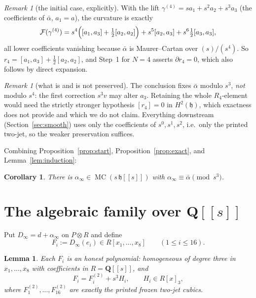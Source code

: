 \documentclass[11pt]{article}
\newtheorem{lemma}[theorem]{Lemma}
\newtheorem{corollary}[theorem]{Corollary}
\theoremstyle{definition}
\theoremstyle{remark}
\newtheorem{remark}[theorem]{Remark}
\newcommand{\QQ}{\mathbf Q}
\newcommand{\MC}{\operatorname{MC}}
\newcommand{\h}{\mathfrak h}
\begin{document}
\begin{remark}[the initial case, explicitly]\label{rem:initial}
With the lift $\gamma^{(4)}=sa_1+s^2a_2+s^3a_3$ (the coefficients of
$\bar\alpha$, $a_1=a$), the curvature is exactly
\[
 \mathcal F(\gamma^{(4)})
 =s^4\Bigl([a_1,a_3]+\tfrac12[a_2,a_2]\Bigr)
 +s^5[a_2,a_3]+s^6\tfrac12[a_3,a_3],
\]
all lower coefficients vanishing because $\bar\alpha$ is Maurer--Cartan
over $(s)/(s^4)$.  So $r_4=[a_1,a_3]+\tfrac12[a_2,a_2]$, and Step~1 for
$N=4$ asserts $\partial r_4=0$, which also follows by direct expansion.
\end{remark}

\begin{remark}[what is and is not preserved]\label{rem:preserved}
The conclusion fixes $\bar\alpha$ modulo $s^3$, \emph{not} modulo $s^4$:
the first correction $s^3v$ may alter $a_3$.  Retaining the whole
$R_4$-element would need the strictly stronger hypothesis $[r_4]=0$ in
$H^2(\h)$, which exactness does not provide and which we do not claim.
Everything downstream (Section~\ref{sec:smooth}) uses only the coefficients
of $s^0,s^1,s^2$, i.e.\ only the printed two-jet, so the weaker
preservation suffices.
\end{remark}

Combining Proposition~\ref{prop:start}, Proposition~\ref{prop:exact}, and
Lemma~\ref{lem:induction}:

\begin{corollary}\label{cor:mcinfty}
There is $\alpha_\infty\in\MC(s\,\h[[s]])$ with
$\alpha_\infty\equiv\bar\alpha\pmod{s^3}$.
\end{corollary}

\section{The algebraic family over $\QQ[[s]]$}\label{sec:family}

Put $D_\infty=d+\alpha_\infty$ on $P\otimes R$ and define
\[
 F_i:=D_\infty(e_i)\in R[x_1,\ldots,x_8]
 \qquad(1\leq i\leq16).
\tag{7.1}\label{eq:cubics}
\]

\begin{lemma}\label{lem:cubicform}
Each $F_i$ is an honest polynomial: homogeneous of degree three in
$x_1,\ldots,x_8$ with coefficients in $R=\QQ[[s]]$, and
\[
 F_i=F^{(2)}_i+s^3H_i,\qquad H_i\in R[x]_3,
\tag{7.2}\label{eq:twojetform}
\]
where $F^{(2)}_1,\ldots,F^{(2)}_{16}$ are exactly the printed frozen
two-jet cubics.
\end{lemma}
\end{document}

